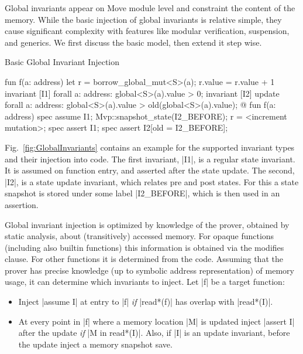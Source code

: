 \label{sec:GlobalInvariants}

Global invariants appear on Move module level and constraint the content of the
memory. While the basic injection of global invariants is relative simple, they
cause significant complexity with features like modular verification, suspension,
and generics. We first discuss the basic model, then extend it step wise.


\begin{Figure}
  \caption{Basic Global Invariant Injection}
  \label{fig:GlobalInvariants}
  \centering
\begin{MoveBox}
  fun f(a: address) {
    let r = borrow_global_mut<S>(a);
    r.value = r.value + 1
  }
  invariant [I1] forall a: address: global<S>(a).value > 0;
  invariant [I2] update forall a: address:
      global<S>(a).value > old(global<S>(a).value);
  @\transform@
  fun f(a: address) {
    spec assume I1;
    Mvp::snapshot_state(I2_BEFORE);
    r = <increment mutation>;
    spec assert I1;
    spec assert I2[old = I2_BEFORE];
  }
\end{MoveBox}
\end{Figure}

Fig.~\ref{fig:GlobalInvariants} contains an example for the supported invariant
types and their injection into code. The first invariant, |I1|, is a regular
state invariant. It is assumed on function entry, and asserted after the state
update. The second, |I2|, is a state update invariant, which relates pre and
post states. For this a state snapshot is stored under some label |I2_BEFORE|,
which is then used in an assertion.

Global invariant injection is optimized by knowledge of the prover, obtained
by static analysis, about (transitively) accessed memory. For opaque functions
(including also builtin functions) this information is obtained via the modifies
clause. For other functions it is determined from the code.  Assuming that the
prover has precise knowledge (up to symbolic address representation) of memory
usage, it can determine which invariants to inject. Let |f| be a target function:

\begin{itemize}
\item Inject |assume I| at entry to |f| \emph{if} |read*(f)| has overlap with
  |read*(I)|.
\item At every point in |f| where a memory location |M| is updated inject
  |assert I| after the update \emph{if} |M in read*(I)|. Also, if |I| is an
  update invariant, before the update inject a memory snapshot save.
\end{itemize}

